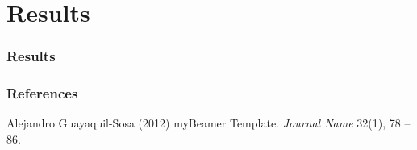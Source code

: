 \documentclass[handout]{beamer}
\begin{document}
\section*{Results}
\begin{frame}
\frametitle{Results}
\end{frame}
\begin{frame}%
\frametitle{References}
%
%
\footnotesize{
\begin{thebibliography}{99}
 Alejandro Guayaquil-Sosa (2012)
\newblock myBeamer Template. %
\newblock \emph{Journal Name} 32(1), 78 -- 86.
\end{thebibliography}}
\end{frame}
\begin{frame}
\begin{center}
\titlepage
\end{center}
\end{frame}
\end{document}
